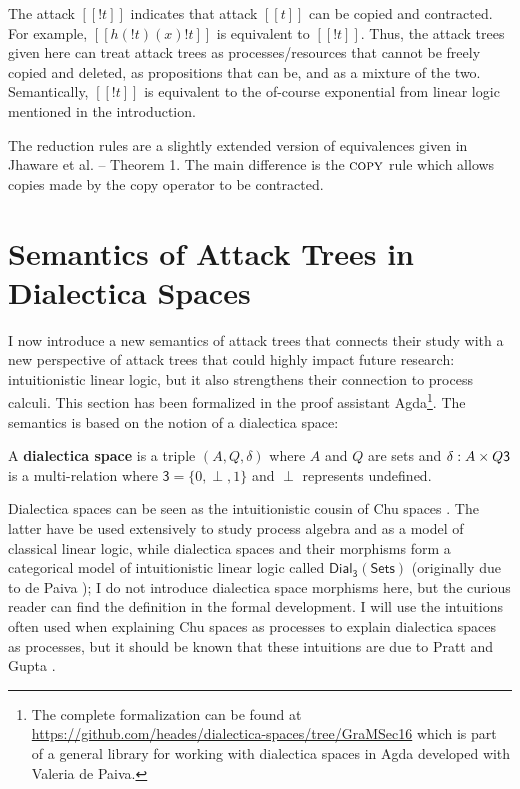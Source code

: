 \documentclass{llncs}
\let\to\relax
\newcommand{\to}{\rightarrow}
\newcommand{\dial}[0]{\mathsf{Dial_3}(\mathsf{Sets})}
\begin{document}
The attack $[[! t]]$ indicates that attack $[[t]]$ can be copied and
contracted.  For example, $[[h(!t) (x) !t]]$ is equivalent to $[[!
    t]]$.  Thus, the attack trees given here can treat attack trees as
processes/resources that cannot be freely copied and deleted, as
propositions that can be, and as a mixture of the two.  Semantically,
$[[! t]]$ is equivalent to the of-course exponential from linear logic
mentioned in the introduction.

The reduction rules are a slightly extended version of equivalences
given in Jhaware et al. \cite{Jhawar:2015} -- Theorem 1.  The main
difference is the $\textsc{copy}$ rule which allows copies made by the
copy operator to be contracted.

\section{Semantics of Attack Trees in Dialectica Spaces}
\label{sec:concrete_semantics_of_attack_trees_in_dialectica_spaces}

I now introduce a new semantics of attack trees that connects their
study with a new perspective of attack trees that could highly impact
future research: intuitionistic linear logic, but it also strengthens
their connection to process calculi.  This section has been formalized
in the proof assistant Agda\footnote{The complete formalization can be
  found at
  \url{https://github.com/heades/dialectica-spaces/tree/GraMSec16}
  which is part of a general library for working with dialectica
  spaces in Agda developed with Valeria de Paiva.}.  The semantics is
based on the notion of a dialectica space:

\begin{definition}
  \label{def:dialectica-space}
  A \textbf{dialectica space} is a triple $(A, Q, \delta)$ where $A$
  and $Q$ are sets and $\delta : A \times Q \to \mathsf{3}$ is a
  multi-relation where $\mathsf{3} = \{0,\perp,1\}$ and $\perp$
  represents undefined.
\end{definition}

Dialectica spaces can be seen as the intuitionistic cousin
\cite{dePaiva:2006b} of Chu spaces \cite{Pratt:1999}.  The latter have
be used extensively to study process algebra and as a model of
classical linear logic, while dialectica spaces and their morphisms
form a categorical model of intuitionistic linear logic called $\dial$
(originally due to de Paiva \cite{dePaiva:1987}); I do not introduce
dialectica space morphisms here, but the curious reader can find the
definition in the formal development. I will use the intuitions often
used when explaining Chu spaces as processes to explain dialectica
spaces as processes, but it should be known that these intuitions are
due to Pratt and Gupta \cite{Gupta:1994}.
\end{document}
